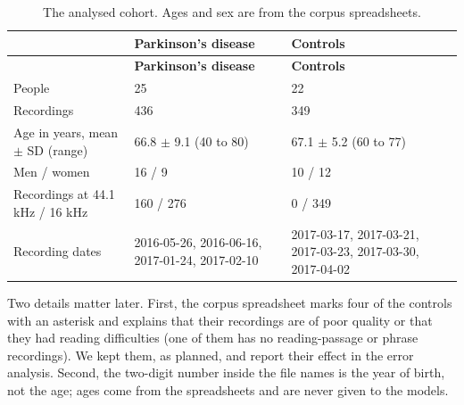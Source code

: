 \documentclass[11pt,a4paper]{article}
\begin{document}
\begin{center}\small\renewcommand{\arraystretch}{1.15}
\begin{longtable}{>{\raggedright\arraybackslash}p{4.30cm}>{\raggedright\arraybackslash}p{5.47cm}>{\raggedright\arraybackslash}p{5.47cm}}
\caption{The analysed cohort. Ages and sex are from the corpus spreadsheets.}\\
\toprule
\textbf{\hspace{0pt}} & \textbf{\hspace{0pt}Parkinson's disease} & \textbf{\hspace{0pt}Controls}\\\midrule\endfirsthead
\toprule
\textbf{\hspace{0pt}} & \textbf{\hspace{0pt}Parkinson's disease} & \textbf{\hspace{0pt}Controls}\\\midrule\endhead
\bottomrule\endfoot
\hspace{0pt}People & \hspace{0pt}25 & \hspace{0pt}22\\
\hspace{0pt}Recordings & \hspace{0pt}436 & \hspace{0pt}349\\
\hspace{0pt}Age in years, mean $\pm$ SD (range) & \hspace{0pt}66.8 $\pm$ 9.1 (40 to 80) & \hspace{0pt}67.1 $\pm$ 5.2 (60 to 77)\\
\hspace{0pt}Men /\allowbreak{} women & \hspace{0pt}16 /\allowbreak{} 9 & \hspace{0pt}10 /\allowbreak{} 12\\
\hspace{0pt}Recordings at 44.1 kHz /\allowbreak{} 16 kHz & \hspace{0pt}160 /\allowbreak{} 276 & \hspace{0pt}0 /\allowbreak{} 349\\
\hspace{0pt}Recording dates & \hspace{0pt}2016-05-26, 2016-06-16, 2017-01-24, 2017-02-10 & \hspace{0pt}2017-03-17, 2017-03-21, 2017-03-23, 2017-03-30, 2017-04-02\\
\end{longtable}\end{center}
Two details matter later. First, the corpus spreadsheet marks four of the controls with an asterisk and explains that their recordings are of poor quality or that they had reading difficulties (one of them has no reading-passage or phrase recordings). We kept them, as planned, and report their effect in the error analysis. Second, the two-digit number inside the file names is the year of birth, not the age; ages come from the spreadsheets and are never given to the models.
\end{document}
